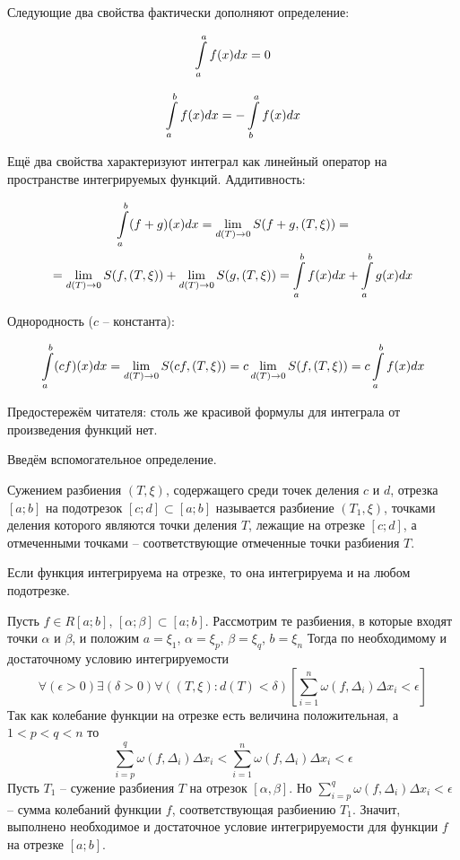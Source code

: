 Следующие два свойства фактически дополняют определение:

\begin{equation}
\int\limits_a^a f(x) dx = 0
\end{equation}

\begin{equation}
\int\limits_a^b f(x) dx = - \int\limits_b^a f(x) dx
\end{equation}

Ещё два свойства характеризуют интеграл как линейный оператор на пространстве интегрируемых функций.
Аддитивность:

\begin{multline}
\int\limits_a^b (f+g)(x) dx = \lim_{d(T)\to 0}S(f+g,(T,\xi))= 
\\=
\lim_{d(T)\to 0}S(f,(T,\xi))+\lim_{d(T)\to 0}S(g,(T,\xi))=\int\limits_a^b f(x) dx+\int\limits_a^b g(x) dx
\end{multline}

Однородность ($c$ -- константа):

$$
\int\limits_a^b (cf)(x)dx = \lim_{d(T)\to 0}S(cf,(T,\xi))=c\lim_{d(T)\to 0}S(f,(T,\xi))=c\int\limits_a^b f(x) dx
$$

Предостережём читателя: столь же красивой формулы для интеграла от произведения функций нет.

Введём вспомогательное определение.

\begin{opr}
Сужением разбиения $(T,\xi)$, содержащего среди точек деления $c$ и $d$, отрезка $[a;b]$ на подотрезок $[c;d]\subset[a;b]$ называется разбиение $(T_1,\xi)$, точками деления которого являются точки деления $T$, лежащие на отрезке $[c;d]$, а отмеченными точками -- соответствующие отмеченные точки разбиения $T$.
\end{opr}

Если функция интегрируема на отрезке, то она интегрируема и на любом подотрезке.

\dokvo

Пусть $f\in R[a;b]$, $[\alpha;\beta]\subset[a;b]$.
Рассмотрим те разбиения, в которые входят точки $\alpha$ и $\beta$, и положим $a=\xi_1$, $\alpha=\xi_p$, $\beta=\xi_q$, $b=\xi_n$
Тогда по необходимому и достаточному условию интегрируемости
$$
\forall(\epsilon>0)\exists(\delta>0)\forall((T,\xi):d(T)<\delta)\left[\sum_{i=1}^n \omega(f,\Delta_i)\Delta x_i < \epsilon\right]
$$
Так как колебание функции на отрезке есть величина положительная, а $1<p<q<n$ то
$$
\sum_{i=p}^q \omega(f,\Delta_i)\Delta x_i < \sum_{i=1}^n \omega(f,\Delta_i)\Delta x_i < \epsilon
$$
Пусть $T_1$ -- сужение разбиения $T$ на отрезок $[\alpha,\beta]$.
Но ${\sum\limits_{i=p}^q \omega(f,\Delta_i)\Delta x_i<\epsilon}$ -- сумма колебаний функции $f$, соответствующая разбиению $T_1$.
Значит, выполнено необходимое и достаточное условие интегрируемости для функции $f$ на отрезке $[a;b]$.

